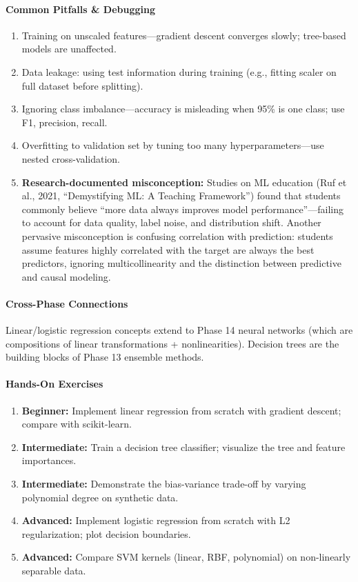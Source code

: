 \documentclass[11pt, a4paper, oneside]{report}
\begin{document}
\paragraph{Common Pitfalls \& Debugging}
\begin{enumerate}[leftmargin=*]
\item Training on unscaled features---gradient descent converges slowly; tree-based models are unaffected.
\item Data leakage: using test information during training (e.g., fitting scaler on full dataset before splitting).
\item Ignoring class imbalance---accuracy is misleading when 95\% is one class; use F1, precision, recall.
\item Overfitting to validation set by tuning too many hyperparameters---use nested cross-validation.

\item \textbf{Research-documented misconception:} Studies on ML education (Ruf et al., 2021, ``Demystifying ML: A Teaching Framework'') found that students commonly believe ``more data always improves model performance''---failing to account for data quality, label noise, and distribution shift. Another pervasive misconception is confusing correlation with prediction: students assume features highly correlated with the target are always the best predictors, ignoring multicollinearity and the distinction between predictive and causal modeling.
\end{enumerate}

\paragraph{Cross-Phase Connections} Linear/logistic regression concepts extend to Phase 14 neural networks (which are compositions of linear transformations + nonlinearities). Decision trees are the building blocks of Phase 13 ensemble methods.

\paragraph{Hands-On Exercises}
\begin{enumerate}[leftmargin=*]
\item \textbf{Beginner:} Implement linear regression from scratch with gradient descent; compare with scikit-learn.
\item \textbf{Intermediate:} Train a decision tree classifier; visualize the tree and feature importances.
\item \textbf{Intermediate:} Demonstrate the bias-variance trade-off by varying polynomial degree on synthetic data.
\item \textbf{Advanced:} Implement logistic regression from scratch with L2 regularization; plot decision boundaries.
\item \textbf{Advanced:} Compare SVM kernels (linear, RBF, polynomial) on non-linearly separable data.
\end{enumerate}
\end{document}
